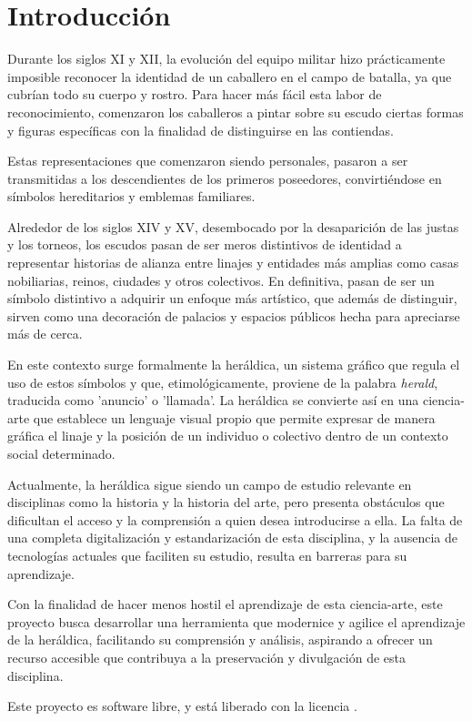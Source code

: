 \chapter{Introducción}

Durante los siglos XI y XII, la evolución del equipo militar hizo prácticamente
imposible reconocer la identidad de un caballero en el campo de batalla, ya que 
cubrían todo su cuerpo y rostro. Para hacer más fácil esta labor de
reconocimiento, comenzaron los caballeros a pintar sobre su escudo ciertas formas
y figuras específicas con la finalidad de distinguirse en las contiendas. 

Estas representaciones que comenzaron siendo personales, pasaron a ser transmitidas
a los descendientes de los primeros poseedores, convirtiéndose en símbolos
hereditarios y emblemas familiares. 

Alrededor de los siglos XIV y XV, desembocado por la desaparición de las justas y 
los torneos, los escudos pasan de ser meros distintivos de identidad a representar
historias de alianza entre linajes y entidades más amplias como casas nobiliarias,
reinos, ciudades y otros colectivos. En definitiva, pasan de ser un símbolo distintivo
a adquirir un enfoque más artístico, que además de distinguir, sirven como una decoración
de palacios y espacios públicos hecha para apreciarse más de cerca.

En este contexto surge formalmente la heráldica, un sistema gráfico que regula el uso 
de estos símbolos y que, etimológicamente, proviene de la palabra \textit{herald}, 
traducida como 'anuncio' o 'llamada'. La heráldica se convierte así en una ciencia-arte
que establece un lenguaje visual propio que permite expresar de manera gráfica el linaje
y la posición de un individuo o colectivo dentro de un contexto social determinado.

Actualmente, la heráldica sigue siendo un campo de estudio relevante en disciplinas
como la historia y la historia del arte, pero presenta obstáculos que dificultan el 
acceso y la comprensión a quien desea introducirse a ella. La falta de una completa
digitalización y estandarización de esta disciplina, y la ausencia de tecnologías
actuales que faciliten su estudio, resulta en barreras para su aprendizaje.

Con la finalidad de hacer menos hostil el aprendizaje de esta ciencia-arte, este
proyecto busca desarrollar una herramienta que modernice y agilice el aprendizaje
de la heráldica, facilitando su comprensión y análisis, aspirando a ofrecer un 
recurso accesible que contribuya a la preservación y divulgación de esta disciplina.

Este proyecto es software libre, y está liberado con la licencia \cite{gplv3}.
